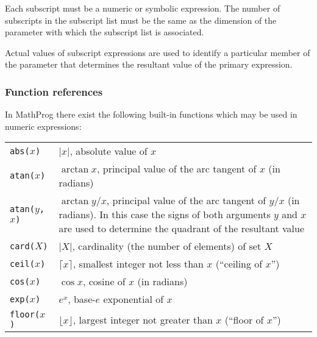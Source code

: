 \documentclass[10pt]{article}
\begin{document}
Each subscript must be a numeric or symbolic expression. The number of
subscripts in the subscript list must be the same as the dimension of
the parameter with which the subscript list is associated.

Actual values of subscript expressions are used to identify
a particular member of the parameter that determines the resultant
value of the primary expression.

\subsubsection{Function references}

In MathProg there exist the following built-in functions which may be
used in numeric expressions:

\medskip

\begin{tabular}{@{}p{96pt}p{222pt}@{}}
{\tt abs(}$x${\tt)}&$|x|$, absolute value of $x$\\
{\tt atan(}$x${\tt)}&$\arctan x$, principal value of the arc tangent of
$x$ (in radians)\\
{\tt atan(}$y${\tt,} $x${\tt)}&$\arctan y/x$, principal value of the
arc tangent of $y/x$ (in radians). In this case the signs of both
arguments $y$ and $x$ are used to determine the quadrant of the
resultant value\\
{\tt card(}$X${\tt)}&$|X|$, cardinality (the number of elements) of
set $X$\\
{\tt ceil(}$x${\tt)}&$\lceil x\rceil$, smallest integer not less than
$x$ (``ceiling of $x$'')\\
{\tt cos(}$x${\tt)}&$\cos x$, cosine of $x$ (in radians)\\
{\tt exp(}$x${\tt)}&$e^x$, base-$e$ exponential of $x$\\
{\tt floor(}$x${\tt)}&$\lfloor x\rfloor$, largest integer not greater
than $x$ (``floor of $x$'')\\
\end{tabular}
\end{document}

